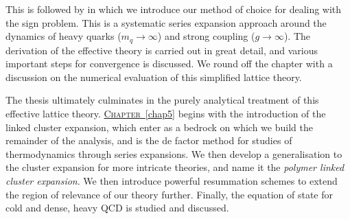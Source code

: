 This is followed by  in which we introduce our method of choice
for dealing with the sign problem. This is a systematic series expansion
approach around the dynamics of heavy quarks ($m_q \to \infty$) and strong
coupling ($g \to \infty$). The derivation of the effective theory is carried out
in great detail, and various important steps for convergence is discussed. We
round off the chapter with a discussion on the numerical evaluation of this
simplified lattice theory.

The thesis ultimately culminates in the purely analytical treatment of this
effective lattice theory. \hyperref[chap5]{\mbox{\textsc{Chapter} \ref*{chap5}}}
begins with the introduction of the linked cluster expansion, which enter as a
bedrock on which we build the remainder of the analysis, and is the de factor
method for studies of thermodynamics through series expansions. We then develop
a generalisation to the cluster expansion for more intricate theories, and name
it the \emph{polymer linked cluster expansion}. We then introduce powerful
resummation schemes to extend the region of relevance of our theory further.
Finally, the equation of state for cold and dense, heavy QCD is studied and
discussed.
